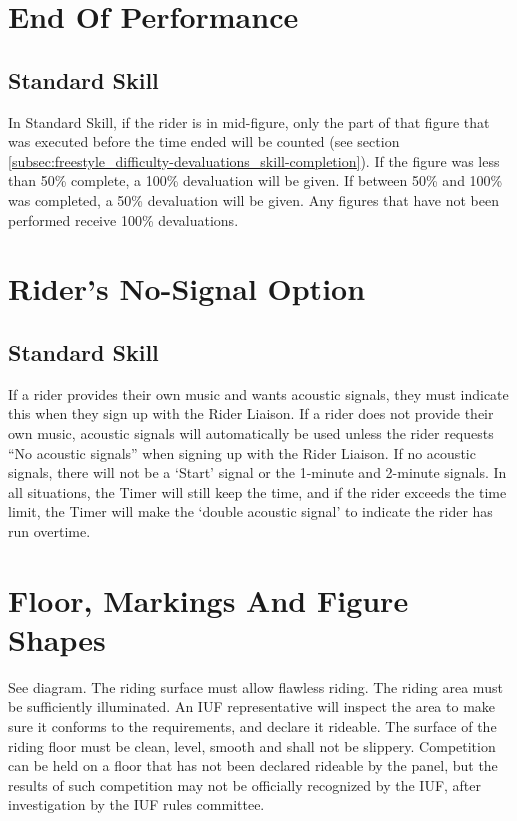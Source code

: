 \section{End Of Performance}

\subsection{Standard Skill}
In Standard Skill, if the rider is in mid-figure, only the part of that figure that was executed before the time ended will be counted (see section \ref{subsec:freestyle_difficulty-devaluations_skill-completion}).
If the figure was less than 50\% complete, a 100\% devaluation will be given.
If between 50\% and 100\% was completed, a 50\% devaluation will be given.
Any figures that have not been performed receive 100\% devaluations.

\section{Rider's No-Signal Option \label{sec:freestyle_riders-no-signal-option}}

\subsection{Standard Skill}
If a rider provides their own music and wants acoustic signals, they must indicate this when they sign up with the Rider Liaison.
If a rider does not provide their own music, acoustic signals will automatically be used unless the rider requests ``No acoustic signals'' when signing up with the Rider Liaison.
If no acoustic signals, there will not be a `Start' signal or the 1-minute and 2-minute signals.
In all situations, the Timer will still keep the time, and if the rider exceeds the time limit, the Timer will make the `double acoustic signal' to indicate the rider has run overtime.

\section{Floor, Markings And Figure Shapes}
See diagram.
The riding surface must allow flawless riding.
The riding area must be sufficiently illuminated.
An IUF representative will inspect the area to make sure it conforms to the requirements, and declare it rideable.
The surface of the riding floor must be clean, level, smooth and shall not be slippery.
Competition can be held on a floor that has not been declared rideable by the panel, but the results of such competition may not be officially recognized by the IUF, after investigation by the IUF rules committee.

